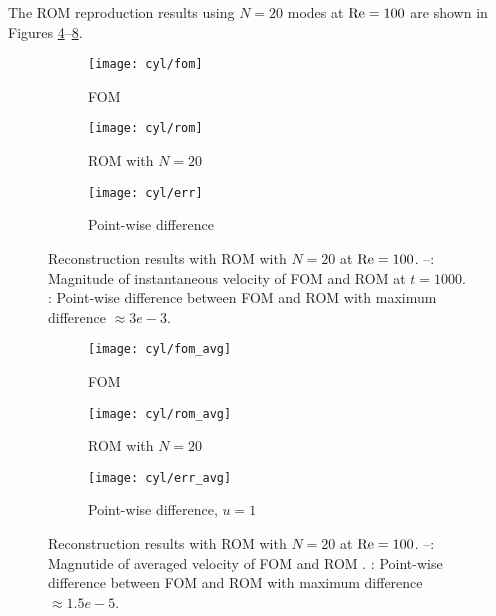 The ROM reproduction results using $N=20$ modes at $\rm Re=100$ are shown in 
Figures \ref{fig:1}--\ref{fig:2}.
\begin{figure}[h]
     \centering
     \begin{subfigure}[b]{0.3\textwidth}
         \centering
         \texttt{[image: cyl/fom]}
         \caption{FOM}
         \label{fig:1_a}
     \end{subfigure}
     \hfill
     \begin{subfigure}[b]{0.3\textwidth}
         \centering
         \texttt{[image: cyl/rom]}
         \caption{ROM with $N=20$}
         \label{fig:1_b}
     \end{subfigure}
     \hfill
     \begin{subfigure}[b]{0.3\textwidth}
         \centering
         \texttt{[image: cyl/err]}
         \caption{Point-wise difference}
         \label{fig:1_c}
     \end{subfigure}
     \caption{Reconstruction results with ROM with $N=20$ at $\rm Re=100$.
--: Magnitude of instantaneous velocity of FOM
and ROM at $t=1000$. : Point-wise difference between FOM and
ROM with maximum difference $\approx 3e-3$.}
      \label{fig:1}
\end{figure}
\begin{figure}[h]
     \centering
     \begin{subfigure}[b]{0.3\textwidth}
         \centering
         \texttt{[image: cyl/fom\_avg]}
         \caption{FOM}
         \label{fig:2_a}
     \end{subfigure}
     \hfill
     \begin{subfigure}[b]{0.3\textwidth}
         \centering
         \texttt{[image: cyl/rom\_avg]}
         \caption{ROM with $N=20$}
         \label{fig:2_b}
     \end{subfigure}
     \hfill
     \begin{subfigure}[b]{0.3\textwidth}
         \centering
         \texttt{[image: cyl/err\_avg]}
         \caption{Point-wise difference, $u=1$}
         \label{fig:2_c}
     \end{subfigure} 
     \caption{Reconstruction results with ROM with $N=20$ at $\rm Re=100$.
     --: Magnutide of averaged velocity of FOM
and ROM .  : Point-wise difference between FOM and ROM with
maximum difference $\approx 1.5e-5$.}
     \label{fig:2}
\end{figure}

